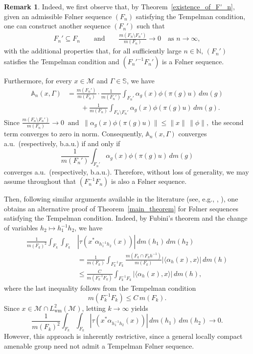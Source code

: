 \documentclass[11pt]{amsart}
\theoremstyle{definition}
\theoremstyle{myremark}
\newtheorem{rem}[thm]{Remark}
\numberwithin{equation}{section}
\def\A{\mathbb A}
\def\S{\mathbb S}
\newcommand{\CM}{\mathcal{M}}
\begin{document}
\begin{rem}
 

\medskip
\noindent 
Indeed, we first observe that, by Theorem~\ref{existence_of_F'_n}, given an admissible Følner sequence $(F_n)$ satisfying the Tempelman condition, one can construct another sequence $(F_n')$ such that
\begin{align}
F_n' \subseteq F_n
\qquad\text{and}\qquad
\frac{m(F_n\setminus F_n')}{m(F_n)} \longrightarrow 0
\quad\text{as } n\to\infty,
\end{align}
with the additional properties that, for all sufficiently large $n\in\mathbb{N}$,
$(F_n')$ satisfies the Tempelman condition and
$(F_n'^{-1}F_n')$ is a Følner sequence.

Furthermore, for every $x\in\CM$ and $\Gamma\in\S$, we have
\begin{align*}
\A_n(x,\Gamma)
&=
\frac{m(F_n')}{m(F_n)}
\cdot
\frac{1}{m(F_n')}
\int_{F_n'}
\alpha_g(x)\phi(\pi(g)u)\,dm(g) \\
&\qquad
+
\frac{1}{m(F_n)}
\int_{F_n\setminus F_n'}
\alpha_g(x)\phi(\pi(g)u)\,dm(g).
\end{align*}
Since $ \frac{m(F_n\setminus F_n')}{m(F_n)}\longrightarrow 0
~\text{ and } ~
\|\alpha_g(x)\phi(\pi(g)u)\|
\leq \|x\|\,\|\phi\|,$
the second term converges to zero in norm. Consequently,
$\A_n(x,\Gamma)$ converges a.u.\ (respectively, b.a.u.) if and only if
\[
\frac{1}{m(F_n')}
\int_{F_n'}
\alpha_g(x)\phi(\pi(g)u)\,dm(g)
\]
converges a.u.\ (respectively, b.a.u.). Therefore, without loss of generality, we may assume throughout that $(F_n^{-1}F_n)$ is also a Følner sequence.






Then, following similar arguments available in the literature (see, e.g., \cite{ElAbdalaoui2021}, \cite{BeyerStroh2010}), one obtains an alternative proof of Theorem~\ref{main_theorem} for Følner sequences satisfying the Tempelman condition. Indeed, by Fubini's theorem and the change of variables $h_2 \mapsto h_1^{-1}h_2$, we have
\begin{align*}
\frac{1}{m(F_k)^2}\int_{F_k}\int_{F_k}
&|\tau(x^*\alpha_{h_1^{-1}h_2}(x))|
\,dm(h_1)\,dm(h_2)  \\
&=
\frac{1}{m(F_k)}
\int_{F_k^{-1}F_k}
\frac{m(F_k\cap F_kh^{-1})}{m(F_k)}
|\langle \alpha_h(x),x\rangle|
\,dm(h)  \\
&\le
\frac{C}{m(F_k^{-1}F_k)}
\int_{F_k^{-1}F_k}
|\langle \alpha_h(x),x\rangle|
\,dm(h),
\end{align*}
where the last inequality follows from the Tempelman condition
\[
m(F_k^{-1}F_k)\le C\,m(F_k).
\]
Since $x\in \mathcal{M}\cap L^2_{\mathrm{wm}}(\mathcal{M})$, letting $k\to\infty$ yields
\[
\frac{1}{m(F_k)^2}\int_{F_k}\int_{F_k}
|\tau(x^*\alpha_{h_1^{-1}h_2}(x))|
\,dm(h_1)\,dm(h_2)\longrightarrow 0.
\]
However, this approach is inherently restrictive, since a general locally compact amenable group need not admit a Tempelman F\o lner sequence.



\end{rem}
\end{document}
